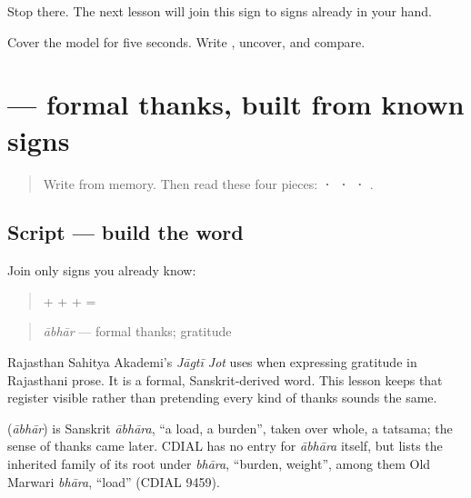 Stop there. The next lesson will join this sign to signs already in your hand.

\begin{tcolorbox}[breakable,colback=teal!4,colframe=teal!35!black,title={Before you move on}]
Cover the model for five seconds. Write \textbf{}, uncover, and compare.
\end{tcolorbox}
\section[\texorpdfstring{\mw{आभार} (ābhār)}{आभार (ābhār)}]{ — formal thanks, built from known signs}

\label{lesson:MW-C02-aabhaar}



\begin{quote}
Write \textbf{} from memory. Then read these four pieces: \textbf{ ·  ·  · }.
\end{quote}

\subsection*{Script — build the word}
Join only signs you already know:

\begin{quote}
\textbf{} + \textbf{} + \textbf{} + \textbf{} = \textbf{}
\end{quote}

\begin{quote}
\emph{ābhār} — formal thanks; gratitude
\end{quote}

Rajasthan Sahitya Akademi's \emph{Jāgtī Jot} uses \textbf{} when expressing gratitude in Rajasthani prose. It is a formal, Sanskrit-derived word. This lesson keeps that register visible rather than pretending every kind of thanks sounds the same.

\begin{cousinweb}
\textbf{} (\emph{ābhār}) is Sanskrit \emph{ābhāra}, \textquotedblleft{}a load, a burden\textquotedblright{}, taken over whole, a tatsama; the sense of thanks came later. CDIAL has no entry for \emph{ābhāra} itself, but lists the inherited family of its root under \emph{bhāra}, \textquotedblleft{}burden, weight\textquotedblright{}, among them Old Marwari \emph{bhāra}, \textquotedblleft{}load\textquotedblright{} (CDIAL 9459).
\end{cousinweb}

